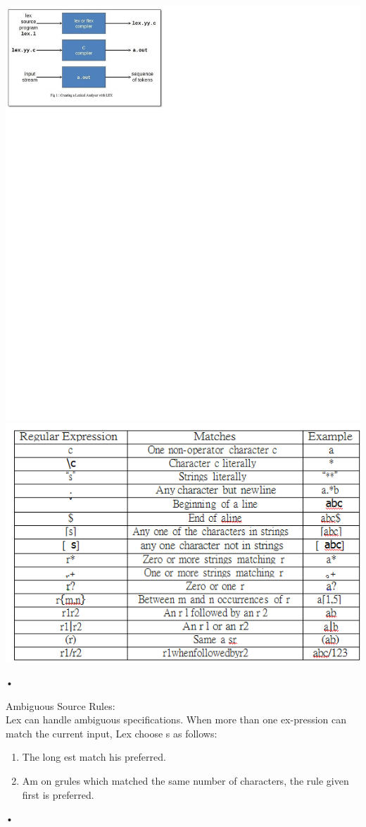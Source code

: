 \documentclass[11pt]{article}
\begin{document}
	\begin{center}
		\includegraphics{temp.png}
		\includegraphics{table.png}
	\end{center}•
	
	\noindent
	Ambiguous Source Rules:\\
	
	Lex can handle ambiguous specifications. When more than one ex-pression can match the current input, Lex choose s as follows:
	\begin{enumerate}
		\item The long est match his preferred.
		\item Am on grules which matched the same number of characters, the rule given first is preferred.
		
	\end{enumerate}•
	
\end{document}
